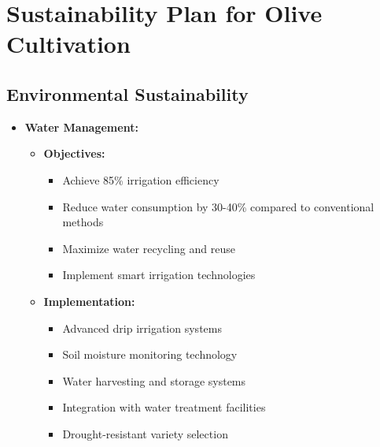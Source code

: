 \section{Sustainability Plan for Olive Cultivation}

\subsection{Environmental Sustainability}
\begin{itemize}
    \item \textbf{Water Management:}
    \begin{itemize}
        \item \textbf{Objectives:}
        \begin{itemize}
            \item Achieve 85\% irrigation efficiency
            \item Reduce water consumption by 30-40\% compared to conventional methods
            \item Maximize water recycling and reuse
            \item Implement smart irrigation technologies
        \end{itemize}
        \item \textbf{Implementation:}
        \begin{itemize}
            \item Advanced drip irrigation systems
            \item Soil moisture monitoring technology
            \item Water harvesting and storage systems
            \item Integration with water treatment facilities
            \item Drought-resistant variety selection
        \end{itemize}
    \end{itemize}
    

\end{itemize}
